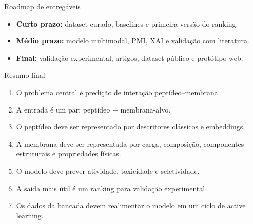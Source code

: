 \documentclass[aspectratio=169,10pt]{beamer}
\begin{document}
\begin{frame}{Roadmap de entregáveis}
\begin{center}
\end{center}
\vspace{0.3cm}
\begin{itemize}
  \item \textbf{Curto prazo:} dataset curado, baselines e primeira versão do ranking.
  \item \textbf{Médio prazo:} modelo multimodal, PMI, XAI e validação com literatura.
  \item \textbf{Final:} validação experimental, artigos, dataset público e protótipo web.
\end{itemize}
\end{frame}

\begin{frame}{Resumo final}
\begin{enumerate}
  \item O problema central é \alert{predição de interação peptídeo--membrana}.
  \item A entrada é um par: peptídeo + membrana-alvo.
  \item O peptídeo deve ser representado por descritores clássicos e embeddings.
  \item A membrana deve ser representada por carga, composição, componentes estruturais e propriedades físicas.
  \item O modelo deve prever atividade, toxicidade e seletividade.
  \item A saída mais útil é um ranking para validação experimental.
  \item Os dados da bancada devem realimentar o modelo em um ciclo de active learning.
\end{enumerate}
\end{frame}
\end{document}
